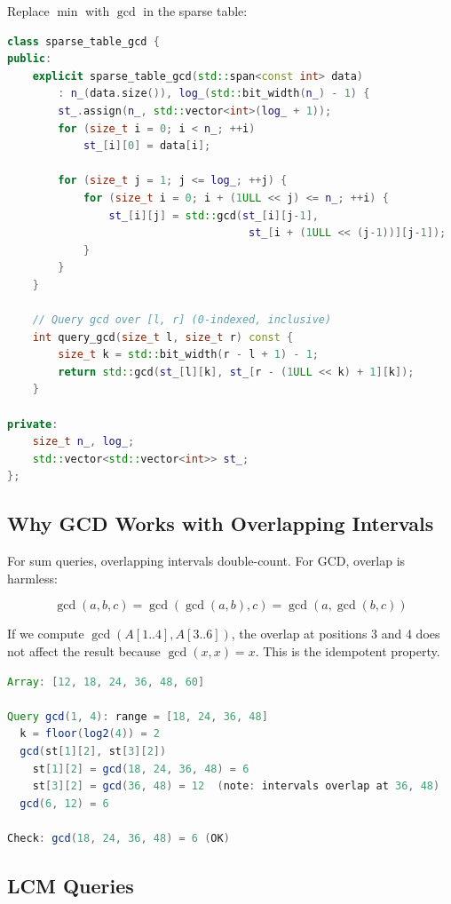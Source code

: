 Replace $\min$ with $\gcd$ in the sparse table:

\begin{lstlisting}[language=C++]
class sparse_table_gcd {
public:
    explicit sparse_table_gcd(std::span<const int> data)
        : n_(data.size()), log_(std::bit_width(n_) - 1) {
        st_.assign(n_, std::vector<int>(log_ + 1));
        for (size_t i = 0; i < n_; ++i)
            st_[i][0] = data[i];

        for (size_t j = 1; j <= log_; ++j) {
            for (size_t i = 0; i + (1ULL << j) <= n_; ++i) {
                st_[i][j] = std::gcd(st_[i][j-1],
                                      st_[i + (1ULL << (j-1))][j-1]);
            }
        }
    }

    // Query gcd over [l, r] (0-indexed, inclusive)
    int query_gcd(size_t l, size_t r) const {
        size_t k = std::bit_width(r - l + 1) - 1;
        return std::gcd(st_[l][k], st_[r - (1ULL << k) + 1][k]);
    }

private:
    size_t n_, log_;
    std::vector<std::vector<int>> st_;
};
\end{lstlisting}

\subsection{Why GCD Works with Overlapping Intervals}

For sum queries, overlapping intervals double-count. For GCD, overlap is harmless:

\[
\gcd(a, b, c) = \gcd(\gcd(a, b), c) = \gcd(a, \gcd(b, c))
\]

If we compute $\gcd(A[1..4], A[3..6])$, the overlap at positions 3 and 4 does not affect the result because $\gcd(x, x) = x$. This is the idempotent property.

\begin{lstlisting}[language=Java]
Array: [12, 18, 24, 36, 48, 60]

Query gcd(1, 4): range = [18, 24, 36, 48]
  k = floor(log2(4)) = 2
  gcd(st[1][2], st[3][2])
    st[1][2] = gcd(18, 24, 36, 48) = 6
    st[3][2] = gcd(36, 48) = 12  (note: intervals overlap at 36, 48)
  gcd(6, 12) = 6

Check: gcd(18, 24, 36, 48) = 6 (OK)
\end{lstlisting}

\subsection{LCM Queries}

